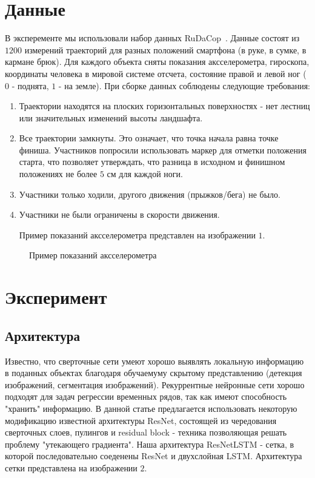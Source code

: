 \documentclass[12pt, twoside]{article}
\begin{document}
\section{Данные}

В эксперементе мы использовали набор данных RuDaCop~\cite{bayev2019rudacop}. Данные состоят из $1200$ измерений траекторий для разных положений смартфона (в руке, в сумке, в кармане брюк). Для каждого объекта сняты показания аксселерометра, гироскопа, координаты человека в мировой системе отсчета, состояние правой и левой ног ($0$ - поднята, $1$ - на земле). При сборке данных соблюдены следующие требования:
\begin{enumerate}
    \item Траектории находятся на плоских горизонтальных поверхностях - нет лестниц или значительных изменений высоты ландшафта.
    \item Все траектории замкнуты. Это означает, что точка начала равна точке финиша. Участников попросили использовать маркер для отметки положения старта, что позволяет утверждать, что разница в исходном и финишном положениях не более $5$ см для каждой
ноги.
\item Участники только ходили, другого движения (прыжков/бега) не было.
\item Участники не были ограничены в скорости движения.

Пример показаний аксселерометра представлен на изображении $1$.

\end{enumerate}
\begin{figure}[!h]
\caption{Пример показаний аксселерометра}
\label{fig:image}
\end{figure}


\newpage

\section{Эксперимент}

\subsection{Архитектура}


Известно, что сверточные сети умеют хорошо выявлять локальную информацию в поданных объектах благодаря обучаемуму скрытому представлению (детекция изображений, сегментация изображений). Рекуррентные нейронные сети хорошо подходят для задач регрессии временных рядов, так как имеют способность "хранить" информацию. В данной статье предлагается использовать некоторую модификацию известной архитектуры ResNet, состоящей из чередования сверточных слоев, пулингов и residual block - техника позволяющая решать проблему "утекающего градиента". Наша архитектура ResNetLSTM - сетка, в которой последовательно соеденены ResNet и двухслойная LSTM. Архитектура сетки представлена на изображении $2.$
\end{document}
